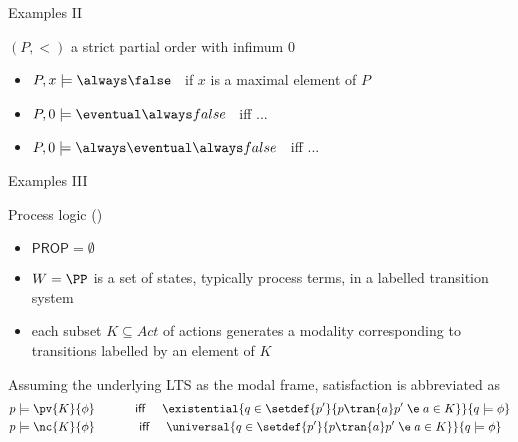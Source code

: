 \documentclass{beamer}
\begin{document}
\begin{slide}{Examples II}\label{s:16}
\small
\begin{block}{$(P,<)$ a strict partial order with infimum $0$}
~\\


\begin{itemize}
\item $P, x \models \always \false\; \;$  if $x$ is a maximal element of $P$
\item $P, 0 \models \eventual \always false\; \;$  iff  ... %
\item $P, 0 \models \always \eventual \always false\; \;$  iff  ... %
\end{itemize}
\end{block}
\end{slide}



\begin{slide}{Examples III}\label{s:17}
\small
\begin{block}{Process logic ()}
\begin{itemize}
\item $\mathsf{PROP} = \emptyset$
\item $W = \PP$ is a set of states, typically process terms, in a labelled transition system 
\item each subset $K \subseteq Act$ of actions generates a modality corresponding to transitions labelled by an element of $K$ 
\end{itemize}
\end{block}
Assuming the underlying LTS  as the modal frame, satisfaction is abbreviated as
\begin{align*}
p & \models \pv{K}{\phi} \text{ ~~~~~~~~ \textsf{iff} ~~~}
\existential{q \in \setdef{p'}{p \tran{a} p' \; \e\;  a \in K}}{q \models \phi} \\
p & \models \nc{K}{\phi} \text{~~~~~~~~~~ \textsf{iff} ~~~}
\universal{q \in \setdef{p'}{p \tran{a} p' \; \e\;  a \in K}}{q \models \phi} 
\end{align*}
\end{slide}
\end{document}
